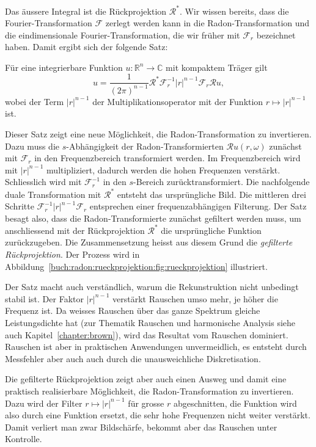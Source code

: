 Das äussere Integral ist die Rückprojektion $\mathscr{R}^*$.
Wir wissen bereits, dass die Fourier-Transformation $\mathscr{F}$
zerlegt werden kann in die Radon-Transformation und die
eindimensionale Fourier-Transformation, die wir früher mit
$\mathscr{F}_r$ bezeichnet haben.
Damit ergibt sich der folgende Satz:

\begin{satz}
Für eine integrierbare Funktion $u\colon\mathbb{R}^n\to\mathbb{C}$ mit kompaktem Träger gilt
\[
u
=
\frac{1}{(2\pi)^{n-1}}
\mathscr{R}^*
\mathscr{F}_r^{-1}
|r|^{n-1}
\mathscr{F}_r
\mathscr{R}u,
\]
wobei der Term $|r|^{n-1}$ der Multiplikationsoperator mit der
Funktion $r\mapsto |r|^{n-1}$ ist.
\end{satz}

Dieser Satz zeigt eine neue Möglichkeit, die Radon-Transformation
zu invertieren.
Dazu muss die $s$-Abhängigkeit der Radon-Transformierten
$\mathscr{R}u(r,\omega)$ 
zunächst mit $\mathscr{F}_r$ in den Frequenzbereich transformiert werden.
Im Frequenzbereich wird mit $|r|^{n-1}$ multipliziert, dadurch
werden die hohen Frequenzen verstärkt.
Schliesslich wird mit $\mathscr{F}_r^{-1}$ in den $s$-Bereich
zurücktransformiert.
Die nachfolgende duale Transformation mit $\mathscr{R}^*$ entsteht
das ursprüngliche Bild.
Die mittleren drei Schritte $\mathscr{F}_r^{-1}|r|^{n-1}\mathscr{F}_r$
entsprechen einer frequenzabhängigen Filterung.
%
%
Der Satz besagt also, dass die Radon-Transformierte zunächst
gefiltert werden muss, um anschliessend mit der Rückprojektion
$\mathscr{R}^*$ die ursprüngliche Funktion zurückzugeben.
Die Zusammensetzung heisst aus diesem Grund die {\em gefilterte
Rückprojektion}.
%
%
Der Prozess wird in
Abbildung~\ref{buch:radon:rueckprojektion:fig:rueckprojektion}
illustriert.

Der Satz macht auch verständlich, warum die Rekunstruktion nicht
unbedingt stabil ist. 
Der Faktor $|r|^{n-1}$ verstärkt Rauschen umso mehr, je höher
die Frequenz ist.
Da weisses Rauschen über das ganze Spektrum gleiche Leistungsdichte
hat (zur Thematik Rauschen und harmonische Analysis siehe auch 
Kapitel~\ref{chapter:brown}),
wird das Resultat vom Rauschen dominiert.
Rauschen ist aber in praktischen Anwendungen unvermeidlich, es
entsteht durch Messfehler aber auch auch durch die unausweichliche
Diskretisation.

Die gefilterte Rückprojektion zeigt aber auch einen Ausweg und 
damit eine praktisch realisierbare Möglichkeit, die Radon-Transformation
zu invertieren.
Dazu wird der Filter $r\mapsto |r|^{n-1}$ für grosse $r$ abgeschnitten,
die Funktion wird also durch eine Funktion ersetzt, die sehr
hohe Frequenzen nicht weiter verstärkt.
Damit verliert man zwar Bildschärfe, bekommt aber das Rauschen unter
Kontrolle.

